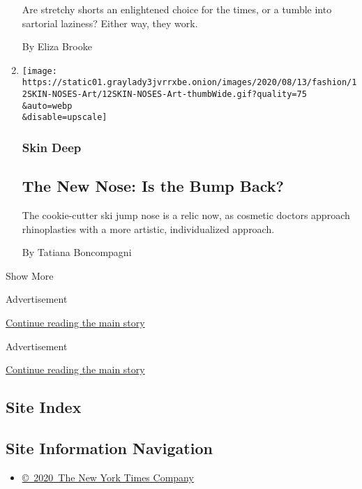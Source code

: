 \begin{enumerate}
  Are stretchy shorts an enlightened choice for the times, or a tumble
  into sartorial laziness? Either way, they work.

  By Eliza Brooke
\item
  \href{/2020/08/12/style/rhinoplasty-the-new-nose-is-the-bump-back.html}{}

  \texttt{[image: https://static01.graylady3jvrrxbe.onion/images/2020/08/13/fashion/12SKIN-NOSES-Art/12SKIN-NOSES-Art-thumbWide.gif?quality=75\\\&auto=webp\\\&disable=upscale]}

  \hypertarget{skin-deep-3}{%
  \subsubsection{Skin Deep}\label{skin-deep-3}}

  \hypertarget{the-new-nose-is-the-bump-back}{%
  \subsection{The New Nose: Is the Bump
  Back?}\label{the-new-nose-is-the-bump-back}}

  The cookie-cutter ski jump nose is a relic now, as cosmetic doctors
  approach rhinoplasties with a more artistic, individualized approach.

  By Tatiana Boncompagni
\end{enumerate}

Show More

Advertisement

\protect\hyperlink{after-mid8}{Continue reading the main story}

Advertisement

\protect\hyperlink{after-mktg}{Continue reading the main story}

\hypertarget{site-index}{%
\subsection{Site Index}\label{site-index}}

\hypertarget{site-information-navigation}{%
\subsection{Site Information
Navigation}\label{site-information-navigation}}

\begin{itemize}
\tightlist
\item
  \href{https://help.nytimes3xbfgragh.onion/hc/en-us/articles/115014792127-Copyright-notice}{©~2020~The
  New York Times Company}
\end{itemize}


